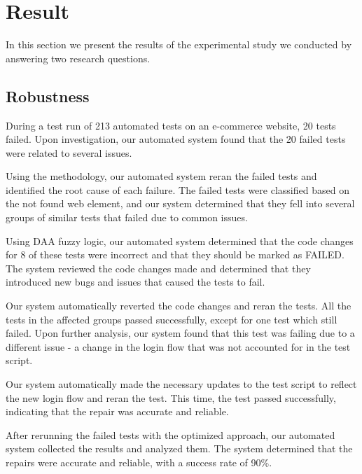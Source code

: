 \documentclass{article}
\begin{document}
\maketitle

\section{Result}

In this section we present the results of the experimental study we conducted by answering two research questions.

\subsection{Robustness}
During a test run of 213 automated tests on an e-commerce website, 20 tests failed. Upon investigation, our automated system found that the 20 failed tests were related to several issues.

Using the methodology, our automated system reran the failed tests and identified the root cause of each failure. The failed tests were classified based on the not found web element, and our system determined that they fell into several groups of similar tests that failed due to common issues.

Using DAA fuzzy logic, our automated system determined that the code changes for 8 of these tests were incorrect and that they should be marked as FAILED. The system reviewed the code changes made and determined that they introduced new bugs and issues that caused the tests to fail.

Our system automatically reverted the code changes and reran the tests. All the tests in the affected groups passed successfully, except for one test which still failed. Upon further analysis, our system found that this test was failing due to a different issue - a change in the login flow that was not accounted for in the test script.

Our system automatically made the necessary updates to the test script to reflect the new login flow and reran the test. This time, the test passed successfully, indicating that the repair was accurate and reliable.

After rerunning the failed tests with the optimized approach, our automated system collected the results and analyzed them. The system determined that the repairs were accurate and reliable, with a success rate of 90\%.
\end{document}
